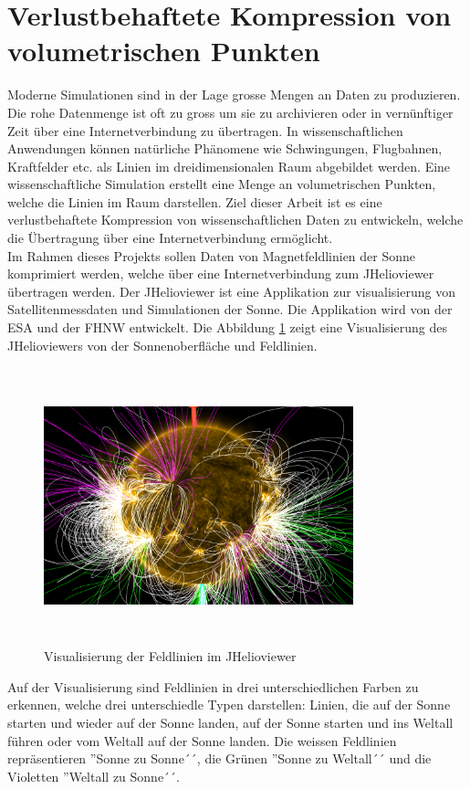 \section{Verlustbehaftete Kompression von volumetrischen Punkten}
Moderne Simulationen sind in der Lage grosse Mengen an Daten zu produzieren. Die rohe Datenmenge ist oft zu gross um sie zu archivieren oder in vernünftiger Zeit über eine Internetverbindung zu übertragen. In wissenschaftlichen Anwendungen können natürliche Phänomene wie Schwingungen, Flugbahnen, Kraftfelder etc. als Linien im dreidimensionalen Raum abgebildet werden. Eine wissenschaftliche Simulation erstellt eine Menge an volumetrischen Punkten, welche die Linien im Raum darstellen. Ziel dieser Arbeit ist es eine verlustbehaftete Kompression von wissenschaftlichen Daten zu entwickeln, welche die Übertragung über eine Internetverbindung ermöglicht.\\
[\baselineskip]
Im Rahmen dieses Projekts sollen Daten von Magnetfeldlinien der Sonne komprimiert werden, welche über eine Internetverbindung zum JHelioviewer übertragen werden. Der JHelioviewer ist eine Applikation zur visualisierung von Satellitenmessdaten und Simulationen der Sonne. Die Applikation wird von der ESA und der FHNW entwickelt. Die Abbildung \ref{einleitung::feldlinien} zeigt eine Visualisierung des JHelioviewers von der Sonnenoberfläche und Feldlinien.\\
\begin{figure}[!htbp]
\center
	\includegraphics[width=0.8\textwidth,height=8cm,keepaspectratio]{./pictures/einleitung/fieldLines.png}
	\caption{Visualisierung der Feldlinien im JHelioviewer}
	\label{einleitung::feldlinien}
\end{figure}
Auf der Visualisierung sind Feldlinien in drei unterschiedlichen Farben zu erkennen, welche drei unterschiedle Typen darstellen: Linien, die auf der Sonne starten und wieder auf der Sonne landen, auf der Sonne starten und ins Weltall führen oder vom Weltall auf der Sonne landen. Die weissen Feldlinien repräsentieren ''Sonne zu Sonne´´, die Grünen ''Sonne zu Weltall´´ und die Violetten ''Weltall zu Sonne´´.\\
